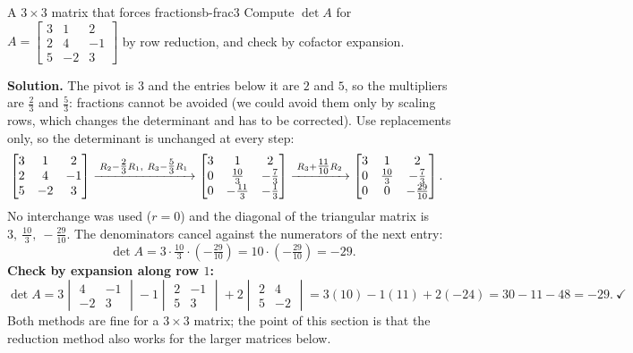 \documentclass[11pt]{article}
\begin{document}
\begin{exmp}{A $3\times3$ matrix that forces fractions}{b-frac3}
Compute $\det A$ for $A=\begin{bmatrix}3&1&2\\2&4&-1\\5&-2&3\end{bmatrix}$ by row reduction, and check by cofactor expansion.

\textbf{Solution.} The pivot is $3$ and the entries below it are $2$ and $5$, so the multipliers are $\tfrac23$ and $\tfrac53$: fractions cannot be avoided (we could avoid them only by scaling rows, which changes the determinant and has to be corrected). Use replacements only, so the determinant is unchanged at every step:
\begin{align*}
\begin{bmatrix}3&1&2\\2&4&-1\\5&-2&3\end{bmatrix}
&\xrightarrow{\;R_2-\tfrac23R_1,\ R_3-\tfrac53R_1\;}
\begin{bmatrix}3&1&2\\0&\tfrac{10}{3}&-\tfrac73\\0&-\tfrac{11}{3}&-\tfrac13\end{bmatrix}
\xrightarrow{\;R_3+\tfrac{11}{10}R_2\;}
\begin{bmatrix}3&1&2\\0&\tfrac{10}{3}&-\tfrac73\\0&0&-\tfrac{29}{10}\end{bmatrix}
.
\end{align*}
No interchange was used ($r=0$) and the diagonal of the triangular matrix is $3,\ \tfrac{10}3,\ -\tfrac{29}{10}$. The denominators cancel against the numerators of the next entry:
\[
\det A=3\cdot\tfrac{10}3\cdot\left(-\tfrac{29}{10}\right)=10\cdot\left(-\tfrac{29}{10}\right)=-29.
\]
\textbf{Check by expansion along row $1$:}
\[
\det A=3\begin{vmatrix}4&-1\\-2&3\end{vmatrix}-1\begin{vmatrix}2&-1\\5&3\end{vmatrix}+2\begin{vmatrix}2&4\\5&-2\end{vmatrix}=3(10)-1(11)+2(-24)=30-11-48=-29.\ \checkmark
\]
Both methods are fine for a $3\times3$ matrix; the point of this section is that the reduction method also works for the larger matrices below.
\end{exmp}
\end{document}
